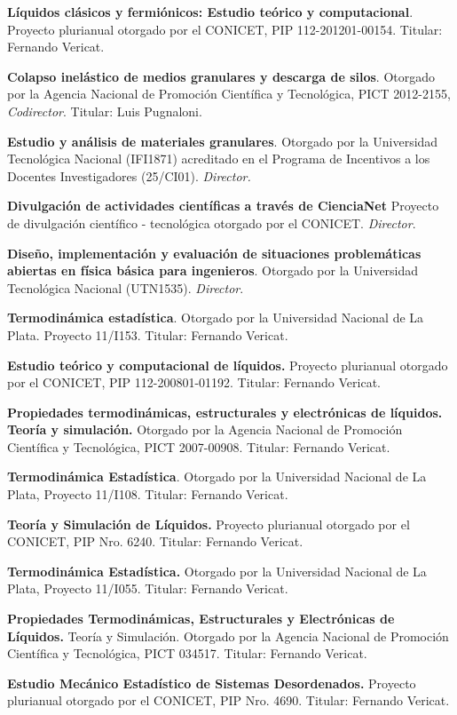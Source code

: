   \textbf{Líquidos clásicos y fermiónicos: Estudio teórico y computacional}. Proyecto plurianual otorgado por el CONICET, PIP 112-201201-00154. Titular: Fernando Vericat.

 \textbf{Colapso inelástico de medios granulares y descarga de silos}. Otorgado por la Agencia Nacional de Promoción Científica y Tecnológica, PICT 2012-2155, \textit{Codirector}. Titular: Luis Pugnaloni.

 \textbf{Estudio y análisis de materiales granulares}. Otorgado por la Universidad Tecnológica Nacional (IFI1871) acreditado en el Programa de Incentivos a los Docentes Investigadores (25/CI01). \textit{Director.}

 \textbf{Divulgación de actividades científicas a través de CienciaNet} Proyecto de divulgación científico - tecnológica otorgado por el CONICET. \textit{Director}.

 \textbf{Diseño, implementación y evaluación de situaciones problemáticas abiertas en física básica para ingenieros}. Otorgado por la Universidad Tecnológica Nacional (UTN1535). \textit{Director}.

 \textbf{Termodinámica estadística}. Otorgado por la Universidad Nacional de La Plata. Proyecto 11/I153. Titular: Fernando Vericat. 

 \textbf{Estudio teórico y computacional de líquidos.} Proyecto plurianual otorgado por el CONICET, PIP  112-200801-01192. Titular: Fernando Vericat.

 \textbf{Propiedades termodinámicas, estructurales y electrónicas de líquidos. Teoría y simulación.} Otorgado por la Agencia Nacional de Promoción Científica y Tecnológica, PICT 2007-00908. Titular: Fernando Vericat.

 \textbf{Termodinámica Estadística}. Otorgado por la Universidad Nacional de La Plata, Proyecto 11/I108. Titular: Fernando Vericat.

 \textbf{Teoría y Simulación de Líquidos.} Proyecto plurianual otorgado por el CONICET, PIP Nro. 6240. Titular: Fernando Vericat.

 \textbf{Termodinámica Estadística.} Otorgado por la Universidad Nacional de La Plata, Proyecto 11/I055. Titular: Fernando Vericat.

 \textbf{Propiedades Termodinámicas, Estructurales y Electrónicas de Líquidos.} Teoría y Simulación. Otorgado por la Agencia Nacional de Promoción Científica y Tecnológica, PICT 034517. Titular: Fernando Vericat.

 \textbf{Estudio Mecánico Estadístico de Sistemas Desordenados.} Proyecto plurianual otorgado por el CONICET, PIP Nro. 4690. Titular: Fernando Vericat.
